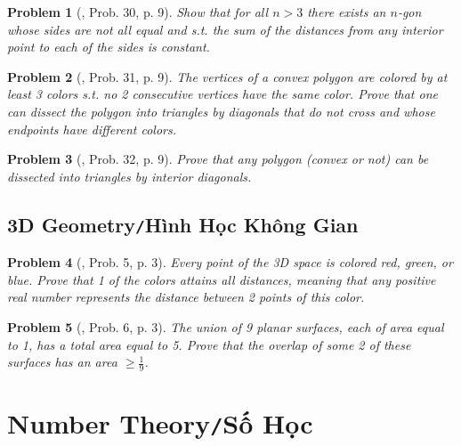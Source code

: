 \documentclass[oneside]{book}
\numberwithin{equation}{section}
\newtheorem{problem}{Problem}[section]
\begin{document}
\begin{problem}[\cite{Gelca_Andreescu2017}, Prob. 30, p. 9]
	Show that for all $n > 3$ there exists an $n$-gon whose sides are not all equal and s.t. the sum of the distances from any interior point to each of the sides is constant.
\end{problem}

\begin{problem}[\cite{Gelca_Andreescu2017}, Prob. 31, p. 9]
	The vertices of a convex polygon are colored by at least 3 colors s.t. no 2 consecutive vertices have the same color. Prove that one can dissect the polygon into triangles by diagonals that do not cross and whose endpoints have different colors.
\end{problem}

\begin{problem}[\cite{Gelca_Andreescu2017}, Prob. 32, p. 9]
	Prove that any polygon (convex or not) can be dissected into triangles by interior diagonals.
\end{problem}

\section{3D Geometry\texttt{/}Hình Học Không Gian}

\begin{problem}[\cite{Gelca_Andreescu2017}, Prob. 5, p. 3]
	Every point of the 3D space is colored red, green, or blue. Prove that 1 of the colors attains all distances, meaning that any positive real number represents the distance between 2 points of this color.
\end{problem}

\begin{problem}	[\cite{Gelca_Andreescu2017}, Prob. 6, p. 3]
	The union of 9 planar surfaces, each of area equal to 1, has a total area equal to 5. Prove that the overlap of some 2 of these surfaces has an area $\ge\frac{1}{9}$.
\end{problem}


\chapter{Number Theory\texttt{/}Số Học}
\end{document}
